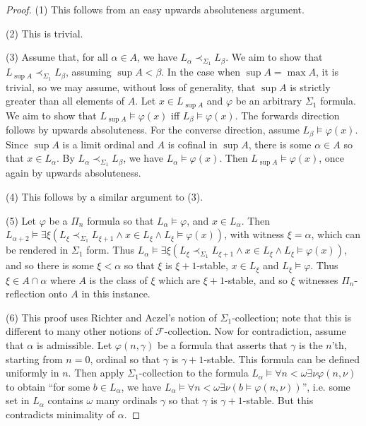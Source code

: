 \documentclass{article}
\theoremstyle{definition}
\theoremstyle{plain}
\theoremstyle{plain}
\theoremstyle{plain}
\theoremstyle{plain}
\theoremstyle{remark}
\theoremstyle{remark}
\theoremstyle{remark}
\theoremstyle{plain}
\theoremstyle{plain}
\theoremstyle{plain}
\begin{document}
\begin{proof}
(1) This follows from an easy upwards absoluteness argument.

(2) This is trivial.

(3) Assume that, for all $\alpha \in A$, we have $L_\alpha \prec_{\Sigma_1} L_\beta$. We aim to show that $L_{\sup A} \prec_{\Sigma_1} L_\beta$, assuming $\sup A < \beta$. In the case when $\sup A = \max A$, it is trivial, so we may assume, without loss of generality, that $\sup A$ is strictly greater than all elements of $A$. Let $x \in L_{\sup A}$ and $\varphi$ be an arbitrary $\Sigma_1$ formula. We aim to show that $L_{\sup A} \models \varphi(x)$ iff $L_\beta \models \varphi(x)$. The forwards direction follows by upwards absoluteness. For the converse direction, assume $L_\beta \models \varphi(x)$. Since $\sup A$ is a limit ordinal and $A$ is cofinal in $\sup A$, there is some $\alpha \in A$ so that $x \in L_\alpha$. By $L_\alpha \prec_{\Sigma_1} L_\beta$, we have $L_\alpha \models \varphi(x)$. Then $L_{\sup A} \models \varphi(x)$, once again by upwards absoluteness.

(4) This follows by a similar argument to (3).

(5) Let $\varphi$ be a $\Pi_n$ formula so that $L_\alpha \models \varphi$, and $x \in L_\alpha$. Then $L_{\alpha+2} \models \exists \xi (L_\xi \prec_{\Sigma_1} L_{\xi+1} \land x \in L_\xi \land L_\xi \models \varphi(x))$, with witness $\xi = \alpha$, which can be rendered in $\Sigma_1$ form. Thus $L_\alpha \models \exists \xi (L_\xi \prec_{\Sigma_1} L_{\xi+1} \land x \in L_\xi \land L_\xi \models \varphi(x))$, and so there is some $\xi < \alpha$ so that $\xi$ is $\xi+1$-stable, $x \in L_\xi$ and $L_\xi \models \varphi$. Thus $\xi \in A \cap \alpha$ where $A$ is the class of $\xi$ which are $\xi+1$-stable, and so $\xi$ witnesses $\Pi_n$-reflection onto $A$ in this instance.

(6) This proof uses Richter and Aczel's notion of $\Sigma_1$-collection; note that this is different to many other notions of $\mathcal{F}$-collection. Now for contradiction, assume that $\alpha$ is admissible. Let $\varphi(n, \gamma)$ be a formula that asserts that $\gamma$ is the $n$'th, starting from $n = 0$, ordinal so that $\gamma$ is $\gamma+1$-stable. This formula can be defined uniformly in $n$. Then apply $\Sigma_1$-collection to the formula $L_\alpha \models \forall n < \omega \exists \nu \varphi(n, \nu)$ to obtain ``for some $b \in L_\alpha$, we have $L_\alpha \models \forall n < \omega \exists \nu (b \models \varphi(n, \nu))$'', i.e. some set in $L_\alpha$ contains $\omega$ many ordinals $\gamma$ so that $\gamma$ is $\gamma+1$-stable. But this contradicts minimality of $\alpha$.
\end{proof}
\end{document}
